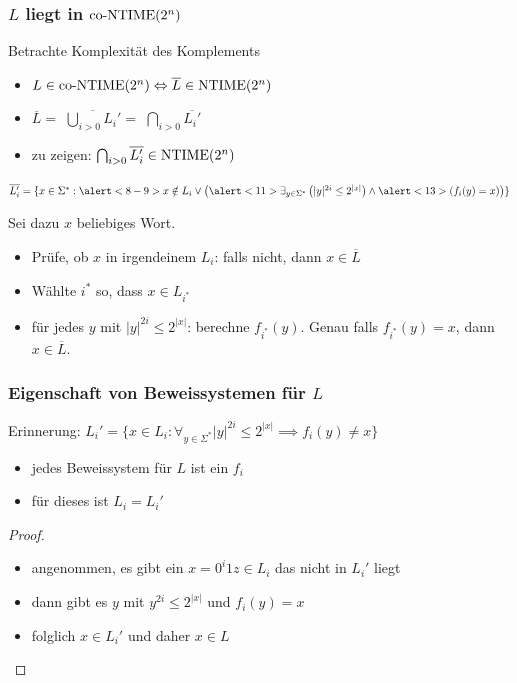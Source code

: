 \begin{frame}
  \frametitle{\(L\) liegt in \(\text{co-NTIME}(2^n)\)}

  Betrachte Komplexität des Komplements
  
  \begin{itemize}
   \item<2-> \(L \in \text{co-NTIME}(2^n) \Leftrightarrow \overline{L} \in \text{NTIME}(2^n)\)
   \item<3-> \(\overline{L} = \)  \( \overline{ \bigcup_{i>0} L_i' } = \)  \( \bigcap_{i>0} \overline{L_i'}\)
   \item<6-> zu zeigen: \( \bigcap_{i>0} \overline{L_i'} \in \text{NTIME}(2^n)\)
  \end{itemize}

  
  \(\overline{L_i'} = \{ x \in \Sigma^* : \alert<8-9>{ x \notin L_i } \vee \left( \alert<11>{ \exists_{y \in \Sigma^*} \left( |y|^{2i} \leq 2^{|x|} \right) } \wedge \alert<13>{ \left( f_i(y) = x \right) } \right)  \}\)

   Sei dazu \(x\) beliebiges Wort.

  \begin{itemize}
   \item<8-> Prüfe, ob \(x\) in irgendeinem \(L_i\):  \alert<9>{falls nicht, dann \(x \in \overline{L}\) }
   \item<10-> Wählte \(i^*\) so, dass \(x \in L_{i^*}\)
   \item<11-> \alert<11>{für jedes \(y\) mit \(|y|^{2i} \leq 2^{|x|}\)}:  berechne \(f_{i^*}(y)\).  \alert<13>{Genau falls \(f_{i^*}(y) = x\), dann \(x \in \overline{L}\).}
  \end{itemize}

\end{frame}


\begin{frame}
  \frametitle{Eigenschaft von Beweissystemen für \(L\)}

  Erinnerung: \(L_i' = \{ x \in L_i : \forall_{y \in \Sigma^*} |y|^{2i} \leq 2^{|x|} \implies f_i(y) \neq x \}\)
  
  \begin{itemize}
   \item<2-> jedes Beweissystem für \(L\) ist ein \(f_i\)
   \item<3-> für dieses ist \(L_i = L_i'\)
  \end{itemize}

  \begin{proof}
    \begin{itemize}
      \item<4-> angenommen, es gibt ein \(x = 0^i1z \in L_i\) das nicht in \(L_i'\) liegt
      \item<5-> dann gibt es \(y\) mit \(y^{2i} \leq 2^{|x|}\) und \(f_i(y) = x\)
      \item<6-> folglich \(x \in L_i'\) und daher \(x \in L\)
    \end{itemize}
  \end{proof}
\end{frame}

